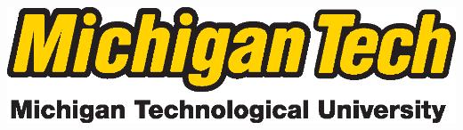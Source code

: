 \documentclass[final]{beamer}
\newlength{\onecolwid}
\begin{document}
\begin{frame}[t]
\begin{columns}[t]
\begin{column}{\onecolwid}
\begin{center}
\includegraphics[width=0.4\linewidth]{logo_withfullname_LG.eps}
\end{center}


\end{column} %

\end{columns} %

\end{frame} %
\end{document}
